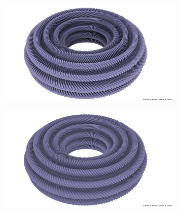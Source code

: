 \documentclass[10pt]{beamer}
\begin{document}
\begin{frame}

    \begin{figure}
        \centering
        \includegraphics[width=0.8\textwidth]{3corrugations.jpg} %
    \end{figure}
    
\end{frame}
\begin{frame}

    \begin{figure}
        \centering
        \includegraphics[width=0.8\textwidth]{4corrugations.jpg} %
    \end{figure}
    
\end{frame}
\end{document}
